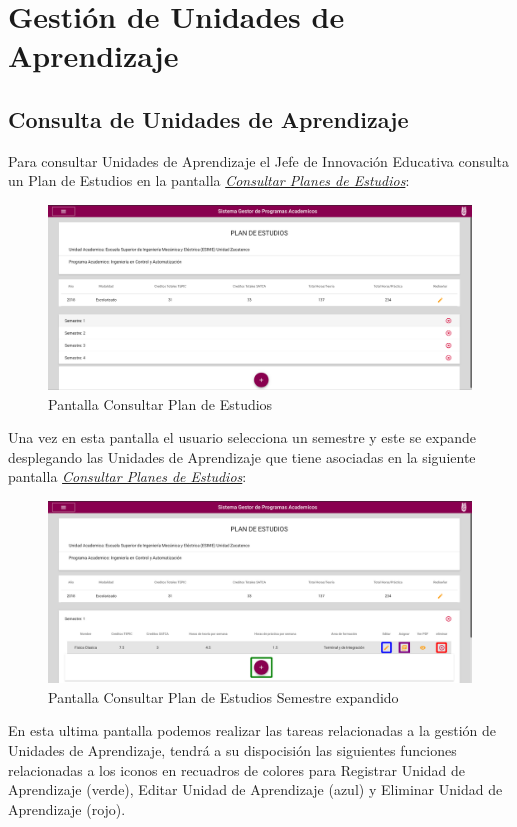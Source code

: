 \chapter{Gestión de Unidades de Aprendizaje}
    \section{Consulta de Unidades de Aprendizaje}
Para consultar Unidades de Aprendizaje el Jefe de Innovación Educativa consulta un Plan de Estudios en la pantalla \hyperlink{consultarS}{\textit{Consultar Planes de Estudios}}:\\
\begin{figure}[!hbtp]
    \centering
    \hypertarget{consultarS}{\includegraphics[width=0.7\linewidth]{images/GUA/consultarS}}
    \caption{Pantalla Consultar Plan de Estudios}
    \label{consultarS}
\end{figure}
\clearpage
Una vez en esta pantalla el usuario selecciona un semestre y este se expande desplegando las Unidades de Aprendizaje que tiene asociadas en la siguiente pantalla \hyperlink{consultarUA}{\textit{Consultar Planes de Estudios}}:\\
\begin{figure}[!hbtp]
    \centering
    \hypertarget{consultarUA}{\includegraphics[width=0.7\linewidth]{images/GUA/consultarUA}}
    \caption{Pantalla Consultar Plan de Estudios Semestre expandido}
    \label{consultarUA}
\end{figure}
En esta ultima pantalla podemos realizar las tareas relacionadas a la gestión de Unidades de Aprendizaje, tendrá a su dispocisión las siguientes funciones relacionadas a los iconos en recuadros de colores para Registrar Unidad de Aprendizaje (verde), Editar Unidad de Aprendizaje (azul) y Eliminar Unidad de Aprendizaje (rojo).
\clearpage
